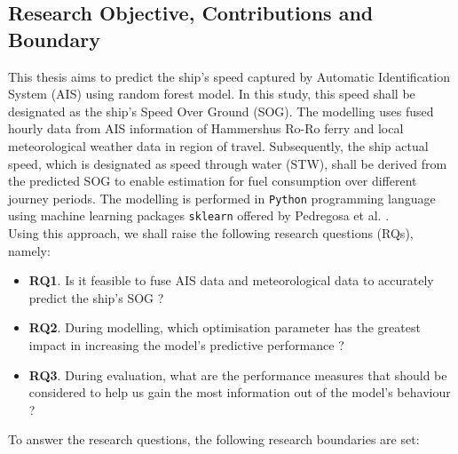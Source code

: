 \subsection{Research Objective, Contributions and Boundary}\label{objectives}

This thesis aims to predict the ship's speed captured by Automatic Identification System (AIS) using random forest model. In this study, this speed shall be designated as the ship's Speed Over Ground (SOG). The modelling uses fused hourly data from AIS information of Hammershus Ro-Ro ferry and local meteorological weather data in region of travel. Subsequently, the ship actual speed, which is designated as speed through water (STW), shall be derived from the predicted SOG to enable estimation for fuel consumption over different journey periods. The modelling is performed in {\tt Python} programming language using machine learning packages {\tt sklearn} offered by Pedregosa et al. \cite{FabianPedregosa.2011}. \\

Using this approach, we shall raise the following research questions (RQs), namely:

\begin{itemize}
    \item \textbf{RQ1}. Is it feasible to fuse AIS data and meteorological data to accurately predict the ship's SOG ?
    \item \textbf{RQ2}. During modelling, which optimisation parameter has the greatest impact in increasing the model's predictive performance ?
    \item \textbf{RQ3}. During evaluation, what are the performance measures that should be considered to help us gain the most information out of the model's behaviour ?
\end{itemize} 

To answer the research questions, the following research boundaries are set:

